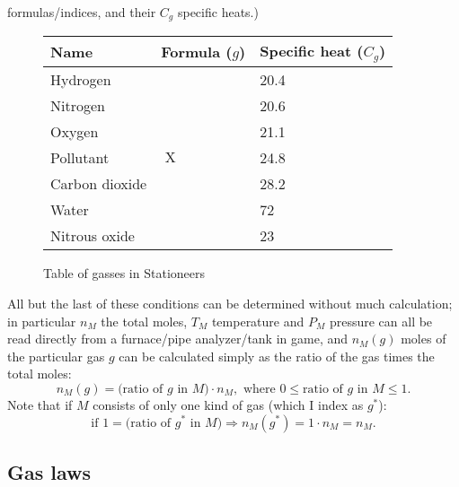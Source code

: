 \documentclass{article}
\DeclareMathOperator{\Hyd}{\mathrm{H}_2}
\DeclareMathOperator{\Nit}{\mathrm{N}_2}
\DeclareMathOperator{\Ox}{\mathrm{O}_2}
\DeclareMathOperator{\Pol}{\mathrm{X}}
\DeclareMathOperator{\CDiox}{\mathrm{CO}_2}
\DeclareMathOperator{\Water}{\mathrm{H}_2\mathrm{O}}
\DeclareMathOperator{\NiOx}{\mathrm{N}_2\mathrm{O}}
\begin{document}
formulas/indices, and their $C_g$ specific heats.)
\begin{figure}
    \begin{center}
        \begin{tabular}{*3l}
            \toprule
            Name & Formula ($g$) & Specific heat ($C_g$) \\
            \midrule
            Hydrogen & $\Hyd$ & 20.4 \\
            Nitrogen & $\Nit$ & 20.6 \\
            Oxygen & $\Ox$ & 21.1 \\
            Pollutant & $\Pol$ & 24.8 \\
            Carbon dioxide & $\CDiox$ & 28.2 \\
            Water & $\Water$ & 72 \\
            Nitrous oxide & $\NiOx$ & 23 \\
            \bottomrule
        \end{tabular}
    \end{center}
    \caption{Table of gasses in Stationeers}
    \label{fig:gas-table}
\end{figure}

All but the last of these conditions can be determined without much calculation; in particular $n_M$
the total moles, $T_M$ temperature and $P_M$ pressure can all be read directly from a furnace/pipe
analyzer/tank in game, and $n_M(g)$ moles of the particular gas $g$ can be calculated simply as the
ratio of the gas times the total moles:
\[
    n_M(g) = \text{(ratio of $g$ in $M$)}\cdot n_M,
    \text{ where } 0 \le \text{ratio of $g$ in $M$} \le 1.
\]
Note that if $M$ consists of only one kind of gas (which I index as $g^*$):
\[
    \text{if } 1 = \text{(ratio of $g^*$ in $M$)}
    \Rightarrow
    n_M(g^*) = 1\cdot n_M = n_M.
\]

\subsection{Gas laws}
\end{document}
